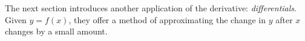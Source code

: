 The next section introduces another application of the derivative: \textit{differentials}. Given $y=f(x)$, they offer a method of approximating the change in $y$ after $x$ changes by a small amount. 


